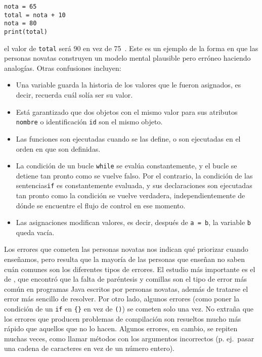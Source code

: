\begin{verbatim}
nota = 65
total = nota + 10
nota = 80
print(total)
\end{verbatim}

\noindent
el valor de \texttt{total} será 90 en vez de 75~\cite{Kohn2017}.
Este es un ejemplo de la forma en que las personas novatas construyen un modelo
mental plausible pero erróneo haciendo analogías. Otras confusiones incluyen:


\begin{itemize}

\item
  Una variable guarda la historia de los valores que le fueron asignados,
  es decir, recuerda cuál solía ser su valor.

\item
  Está garantizado que dos objetos con el mismo valor para sus atributos \texttt{nombre}
  o  identificación \texttt{id} son el mismo objeto.   
 

\item
  Las funciones son ejecutadas cuando se las define,
  o son ejecutadas en el orden en que son definidas.

\item
  La condición de un bucle \texttt{while} se evalúa constantemente,
  y el bucle se detiene tan pronto como se vuelve falso.
  Por el contrario,
  la condición de las sentencias\texttt{if} es constantemente evaluada,
  y sus declaraciones son ejecutadas tan pronto como la condición se vuelve verdadera,
 independientemente de dónde se encuentre el flujo de control en ese momento.

\item
  Las asignaciones modifican valores,
  es decir, después de \texttt{a\ =\ b}, la variable \texttt{b} queda vacía.

\end{itemize}


Los errores que cometen las personas novatas nos indican qué priorizar cuando enseñamos,
pero resulta que la mayoría de las personas que enseñan no saben cuán comunes son los diferentes tipos de errores.
El estudio más importante es el de \cite{Brow2017},
que encontró que la falta de paréntesis y comillas son el tipo de error más común en programas Java escritos por personas novatas,
además de tratarse el error más sencillo de resolver. Por otro lado,
algunos errores (como poner la condición de un \texttt{if} en \texttt{\{\}} en vez de \texttt{()})
se cometen solo una vez.
No extraña que los errores que producen problemas de compilación son resueltos mucho más rápido
que aquellos que no lo hacen.
Algunos errores, en cambio, se repiten muchas veces, como llamar métodos con los argumentos incorrectos
(p. ej.\ pasar una cadena  de caracteres en vez de un número entero).

